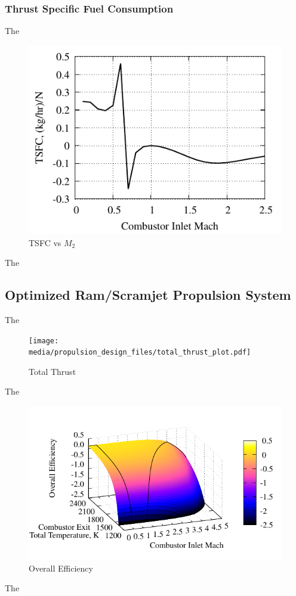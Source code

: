 \documentclass[conf]{new-aiaa} %
\begin{document}
\subsubsection{Thrust Specific Fuel Consumption}
The

\begin{figure}[hbt!] %
    \centering
    \includegraphics[]{media/performance_parameter_files/part_h_TSFC.pdf}
    \caption{\label{fig:parthtsfc}TSFC vs \texorpdfstring{\textit{$M_2$}}{M2}}
\end{figure}
The

\subsection{Optimized Ram/Scramjet Propulsion System} %
The

\begin{figure}[hbt!] %
    \centering
    \texttt{[image: media/propulsion\_design\_files/total\_thrust\_plot.pdf]}
    \caption{\label{fig:partithrust}Total Thrust}
\end{figure}
The

\begin{figure}[hbt!] %
    \centering
    \includegraphics[]{media/propulsion_design_files/eta_o_plot.pdf}
    \caption{\label{fig:partietao}Overall Efficiency}
\end{figure}
The
\end{document}
